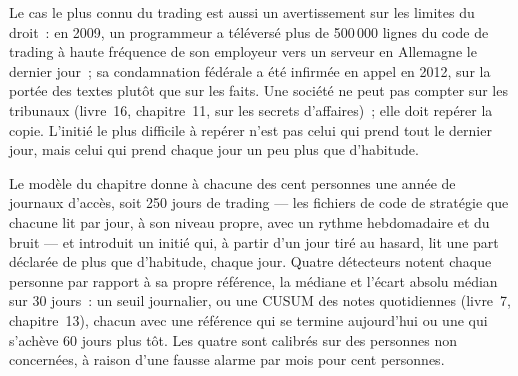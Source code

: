 Le cas le plus connu du trading est aussi un avertissement sur les limites du droit~: en 2009, un programmeur a téléversé plus de 500\,000 lignes du code de trading à haute
fréquence de son employeur vers un serveur en Allemagne le dernier jour~; sa condamnation fédérale a été infirmée en appel en 2012, sur la portée des textes plutôt que sur les faits.
Une société ne peut pas compter sur les tribunaux (livre~16, chapitre~11, sur les secrets d'affaires)~; elle doit repérer
la copie. L'initié le plus difficile à repérer n'est pas celui qui prend tout le dernier jour, mais celui qui prend chaque jour un peu plus que d'habitude.

Le modèle du chapitre donne à chacune des cent personnes une année de journaux d'accès, soit 250 jours de trading --- les fichiers de code de stratégie que chacune lit
par jour, à son niveau propre, avec un rythme hebdomadaire et du bruit --- et introduit un initié qui, à partir d'un jour tiré au hasard, lit une part déclarée
de plus que d'habitude, chaque jour. Quatre détecteurs notent chaque personne par rapport à sa propre référence, la médiane et l'écart absolu médian sur 30 jours~:
un seuil journalier, ou une CUSUM des notes quotidiennes (livre~7, chapitre~13), chacun avec une référence qui se termine aujourd'hui ou une qui s'achève 60 jours
plus tôt. Les quatre sont calibrés sur des personnes non concernées, à raison d'une fausse alarme par mois pour cent personnes.

\label{lst:pl:security:scores}

